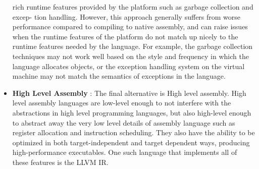 \documentclass{book}
\begin{document}
\begin{itemize}
		rich runtime features provided by the platform such as garbage collection and excep-
		tion handling.   However,  this approach generally suffers from worse performance
		compared to compiling to native assembly, and can raise issues when the runtime
		features of the platform do not match up nicely to the runtime features needed by the
		language.  For example, the garbage collection techniques may not work well based
		on the style and frequency in which the language allocates objects, or the exception
		handling system on the virtual machine may not match the semantics of exceptions
		in the language.
		\item \textbf{High Level Assembly} : The final alternative is High level assembly.  High level assembly languages are
		low-level enough to not interfere with the abstractions in high level programming
		languages,  but  also  high-level  enough  to  abstract  away  the  very  low  level  details
		of assembly language such as register allocation and instruction scheduling.  They
		also have the ability to be optimized in both target-independent and target dependent
		ways, producing high-performance executables. One such language that implements
		all of these features is the LLVM IR.
	\end{itemize}
	
\end{document}
